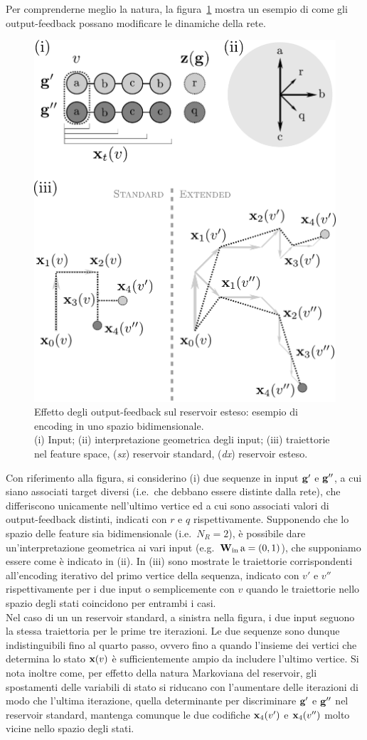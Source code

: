Per comprenderne meglio la natura, la figura~\ref{fig:modelli:aux} mostra un esempio di come gli output-feedback possano modificare le dinamiche della rete. 
\begin{figure}[tb]
\centering
\includegraphics[width=0.65\columnwidth]{img/spazio-stati}
\medskip
\caption[Dinamiche del Reservoir esteso.]{Effetto degli output-feedback sul reservoir esteso: esempio di encoding in uno spazio bidimensionale.\\(i) Input; (ii) interpretazione geometrica degli input; (iii) traiettorie nel feature space, (\emph{sx}) reservoir standard, (\emph{dx}) reservoir esteso.}
\label{fig:modelli:aux}
\end{figure}
Con riferimento alla figura, si considerino (i) due sequenze in input $\mathbf{g}'$ e $\mathbf{g}''$, a cui siano associati target diversi (i.e.\ che debbano essere distinte dalla rete), che differiscono unicamente nell'ultimo vertice ed a cui sono associati valori di output-feedback distinti, indicati con $r$ e $q$ rispettivamente. Supponendo che lo spazio delle feature sia bidimensionale (i.e.\ $N_R = 2$), è possibile dare un'interpretazione geometrica ai vari input (e.g.\ $\matr{W}_\textup{in}\, \mathrm{a} = (0,1)$), che supponiamo essere come è indicato in (ii). In (iii) sono mostrate le traiettorie corrispondenti all'encoding iterativo del primo vertice della sequenza, indicato con $v'$ e $v''$ rispettivamente per i due input o semplicemente con $v$ quando le traiettorie nello spazio degli stati coincidono per entrambi i casi. \\
Nel caso di un un reservoir standard, a sinistra nella figura, i due input seguono la stessa traiettoria per le prime tre iterazioni. Le due sequenze sono dunque indistinguibili fino al quarto passo, ovvero fino a quando l'insieme dei vertici che determina lo stato $\mathbf{x}(v)$ è sufficientemente ampio da includere l'ultimo vertice. Si nota inoltre come, per effetto della natura Markoviana del reservoir, gli spostamenti delle variabili di stato si riducano con l'aumentare delle iterazioni di modo che l'ultima iterazione, quella determinante per discriminare $\mathbf{g}'$ e $\mathbf{g}''$ nel reservoir standard, mantenga comunque le due codifiche $\mathbf{x}_4(v')$ e $\mathbf{x}_4(v'')$ molto vicine nello spazio degli stati. \\
